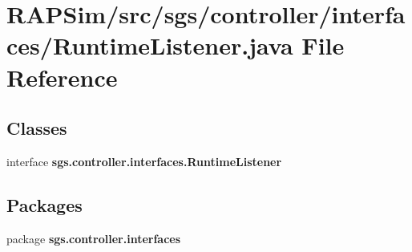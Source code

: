 \section{R\-A\-P\-Sim/src/sgs/controller/interfaces/\-Runtime\-Listener.java File Reference}
\label{_runtime_listener_8java}
\subsection*{Classes}
\begin{DoxyCompactItemize}
\item 
interface {\bf sgs.\-controller.\-interfaces.\-Runtime\-Listener}
\end{DoxyCompactItemize}
\subsection*{Packages}
\begin{DoxyCompactItemize}
\item 
package {\bf sgs.\-controller.\-interfaces}
\end{DoxyCompactItemize}
